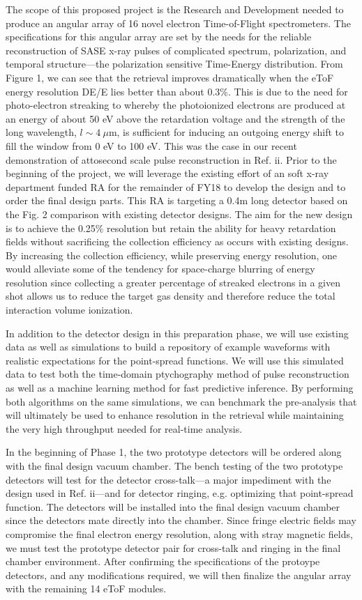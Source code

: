 The scope of this proposed project is the Research and Development needed to produce an angular array of 16 novel electron Time-of-Flight spectrometers.  
The specifications for this angular array are set by the needs for the reliable reconstruction of SASE x-ray pulses of complicated spectrum, polarization, and temporal structure—the polarization sensitive Time-Energy distribution.
From Figure 1, we can see that the retrieval improves dramatically when the eToF energy resolution DE/E lies better than about 0.3\%.  
This is due to the need for photo-electron streaking to whereby the photoionized electrons are produced at an energy of about 50 eV above the retardation voltage and the strength of the long wavelength, $l \sim4~\mu$m, is sufficient for inducing an outgoing energy shift to fill the window from 0 eV to 100 eV.  
This was the case in our recent demonstration of attosecond scale pulse reconstruction in Ref. ii.
Prior to the beginning of the project, we will leverage the existing effort of an soft x-ray department funded RA for the remainder of FY18 to develop the design and to order the final design parts.  
This RA is targeting a 0.4m long detector based on the Fig. 2 comparison with existing detector designs.  
The aim for the new design is to achieve the 0.25\% resolution but retain the ability for heavy retardation fields without sacrificing the collection efficiency as occurs with existing designs.  
By increasing the collection efficiency, while preserving energy resolution, one would alleviate some of the tendency for space-charge blurring of energy resolution since collecting a greater percentage of streaked electrons in a given shot allows us to reduce the target gas density and therefore reduce the total interaction volume ionization.

In addition to the detector design in this preparation phase, we will use existing data as well as simulations to build a repository of example waveforms with realistic expectations for the point-spread functions.  
We will use this simulated data to test both the time-domain ptychography method of pulse reconstruction as well as a machine learning method for fast predictive inference.
By performing both algorithms on the same simulations, we can benchmark the pre-analysis that will ultimately be used to enhance resolution in the retrieval while maintaining the very high throughput needed for real-time analysis.

In the beginning of Phase 1, the two prototype detectors will be ordered along with the final design vacuum chamber. 
The bench testing of the two prototype detectors will test for the detector cross-talk—a major impediment with the design used in Ref. ii—and for detector ringing, e.g. optimizing that point-spread function.  
The detectors will be installed into the final design vacuum chamber since the detectors mate directly into the chamber.  
Since fringe electric fields may compromise the final electron energy resolution, along with stray magnetic fields, we must test the prototype detector pair for cross-talk and ringing in the final chamber environment.  
After confirming the specifications of the protoype detectors, and any modifications required, we will then finalize the angular array with the remaining 14 eToF modules.

